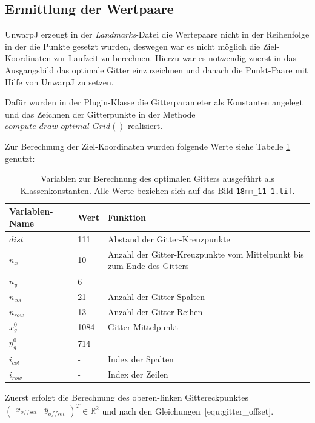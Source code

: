 \subsection{Ermittlung der Wertpaare}
\label{sec:Wertpaare}

UnwarpJ erzeugt in der \textit{Landmarks}-Datei die Wertepaare nicht in der Reihenfolge in der die Punkte gesetzt wurden, deswegen war es nicht möglich die Ziel-Koordinaten zur Laufzeit zu berechnen. Hierzu war es notwendig zuerst in das Ausgangsbild das optimale Gitter einzuzeichnen und danach die Punkt-Paare mit Hilfe von UnwarpJ zu setzen.

Dafür wurden in der Plugin-Klasse die Gitterparameter als Konstanten angelegt und das Zeichnen der Gitterpunkte in der Methode $compute\_draw\_optimal\_Grid()$ realisiert.

Zur Berechnung der Ziel-Koordinaten wurden folgende Werte siehe Tabelle \ref{tab:gitter_koordinaten_variablen} genutzt:

\begin{table}
\centering
\begin{tabular}{|l|l|p{}|}
\toprule
Variablen-Name & Wert & Funktion\\
\midrule
$dist$ & 111 & Abstand der Gitter-Kreuzpunkte\\
\midrule
$n_x$ & 10 & Anzahl der Gitter-Kreuzpunkte vom Mittelpunkt bis zum Ende des Gitters\\
$n_y$ & 6 & \\
\midrule
$n_{col}$ & 21 & Anzahl der Gitter-Spalten\\
$n_{row}$ & 13 & Anzahl der Gitter-Reihen\\
\midrule
$x_g^0$ & 1084 & Gitter-Mittelpunkt \\
$y_g^0$ & 714 & \\
\midrule
$i_{col}$ & - & Index der Spalten \\
$i_{row}$ & - & Index der Zeilen\\
\bottomrule
\end{tabular}
\caption{Variablen zur Berechnung des optimalen Gitters ausgeführt als Klassenkonstanten. Alle Werte beziehen sich auf das Bild \texttt{18mm\_11-1.tif}. }
\label{tab:gitter_koordinaten_variablen}
\end{table}

Zuerst erfolgt die Berechnung des oberen-linken Gittereckpunktes $\begin{pmatrix}
x_{offset} & y_{offset}\end{pmatrix}^T \in \mathbb{R}^2$ und nach den Gleichungen~\ref{equ:gitter_offset}. 

